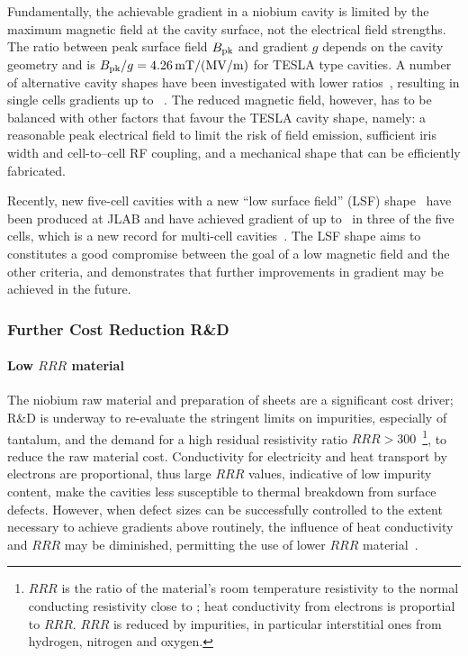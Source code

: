 Fundamentally, the achievable gradient in a niobium cavity is limited by the maximum magnetic field at the cavity surface, not the electrical field strengths.
The ratio between peak surface field $B_{\mathrm{pk}}$ and gradient $g$ depends on the cavity geometry and is $B_{\mathrm{pk}}/g = 4.26\,{\mathrm{mT / (MV/m)}}$ for TESLA type cavities.
A number of alternative cavity shapes have been investigated with lower ratios~\cite{Geng:2006wf},
resulting in single cells gradients up to ~\cite{Eremeev:2007zza}.
The reduced magnetic field, however, has to be balanced with other factors that favour the TESLA cavity shape, namely: a reasonable peak electrical field to limit the risk of field emission, sufficient iris width and cell-to--cell RF coupling, and a mechanical shape that can be efficiently fabricated.

Recently, new five-cell cavities with a new ``low surface field'' (LSF) shape~\cite{Li:2008a} have been produced at JLAB and have achieved gradient of up to~ in three of the five cells, which is a new record for multi-cell cavities~\cite{bib:Geng:2018.lcws}. 
The LSF shape aims to constitutes a good compromise between the goal of a low magnetic field and the other criteria, and demonstrates that further improvements in gradient may be achieved in the future.


\subsubsection{Further Cost Reduction R\&D}

\paragraph{Low $RRR$ material}

The niobium raw material and preparation of sheets  are a significant cost driver; R\&D is underway to re-evaluate the stringent limits on impurities, especially of tantalum, and the demand for a high residual resistivity ratio $RRR > 300$~\footnote{$RRR$ is the ratio of the material's room temperature resistivity to the normal conducting resistivity close to ; heat conductivity from electrons is proportial to $RRR$. $RRR$ is reduced by impurities, in particular interstitial ones  from hydrogen, nitrogen and oxygen.}, to reduce the raw material cost. 
Conductivity for electricity and heat transport by electrons are proportional,
thus large $RRR$ values, indicative of low impurity content, make the cavities less susceptible to thermal breakdown from surface defects.
However, when defect sizes can be successfully controlled to the extent necessary to achieve gradients above  routinely, the influence of heat conductivity and $RRR$ may be diminished, permitting the use of lower $RRR$ material~\cite{bib:Kubo:2018.ttc}.


